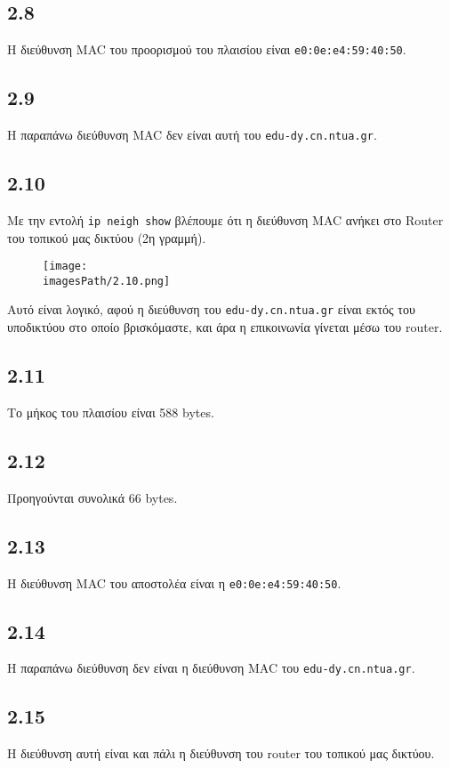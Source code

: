 		\subsection*{2.8}
			H διεύθυνση MAC του προορισμού του πλαισίου είναι \verb|e0:0e:e4:59:40:50|.
		
		\subsection*{2.9}
			Η παραπάνω διεύθυνση MAC δεν είναι αυτή του \verb|edu-dy.cn.ntua.gr|.
		
		\subsection*{2.10}
			Με την εντολή \verb|ip neigh show| βλέπουμε ότι η διεύθυνση MAC ανήκει στο Router του τοπικού μας δικτύου (2η γραμμή). 
			
			\begin{figure}[H]
				\texttt{[image: \\imagesPath/2.10.png]}
			\end{figure}
		
			Αυτό είναι λογικό, αφού η διεύθυνση του \verb|edu-dy.cn.ntua.gr| είναι εκτός του υποδικτύου στο οποίο βρισκόμαστε, και άρα η επικοινωνία γίνεται μέσω του router.
		
		\subsection*{2.11}
			Το μήκος του πλαισίου είναι 588 bytes.
		
		\subsection*{2.12}
			Προηγούνται συνολικά 66 bytes.
		
		\subsection*{2.13}
			Η διεύθυνση MAC του αποστολέα είναι η \verb|e0:0e:e4:59:40:50|.
		
		\subsection*{2.14}
			Η παραπάνω διεύθυνση δεν είναι η διεύθυνση MAC του \verb|edu-dy.cn.ntua.gr|.
		
		\subsection*{2.15}
			Η διεύθυνση αυτή είναι και πάλι η διεύθυνση του router του τοπικού μας δικτύου.
		
